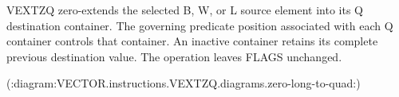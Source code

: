VEXTZQ zero-extends the selected B, W, or L source element into its Q destination
container.  The governing predicate position associated with each Q container
controls that container.  An inactive container retains its complete previous
destination value.  The operation leaves FLAGS unchanged.

(:diagram:VECTOR.instructions.VEXTZQ.diagrams.zero-long-to-quad:)
